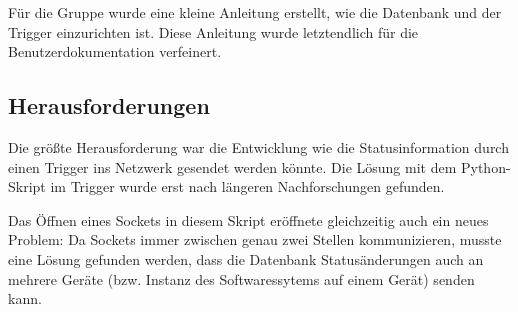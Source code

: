 Für die Gruppe wurde eine kleine Anleitung erstellt, wie die Datenbank und der Trigger einzurichten ist. Diese Anleitung wurde letztendlich für die Benutzerdokumentation verfeinert.

\subsection{Herausforderungen}
Die größte Herausforderung war die Entwicklung wie die Statusinformation durch einen Trigger ins Netzwerk gesendet werden könnte. Die Lösung mit dem Python-Skript im Trigger wurde erst nach längeren Nachforschungen gefunden.

Das Öffnen eines Sockets in diesem Skript eröffnete gleichzeitig auch ein neues Problem: Da Sockets immer zwischen genau zwei Stellen kommunizieren, musste eine Lösung gefunden werden, dass die Datenbank Statusänderungen auch an mehrere Geräte (bzw. Instanz des Softwaressytems auf einem Gerät) senden kann.

